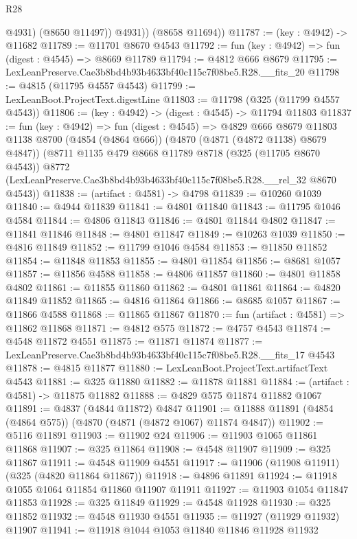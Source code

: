 \begin{lexlean}{R28}
\begin{coremodule}
              @4931)
            (@8650 @11497))
          @4931))
      (@8658 @11694))
@11787 := (key : @4942) -> @11682
@11789 := @11701 @8670 @4543
@11792 := fun (key : @4942) => fun (digest : @4545) => @8669 @11789
@11794 := @4812 @666 @8679
@11795 := LexLeanPreserve.Cae3b8bd4b93b4633bf40c115c7f08be5.R28.__fits_20
@11798 := @4815 (@11795 @4557 @4543)
@11799 := LexLeanBoot.ProjectText.digestLine
@11803 := @11798 (@325 (@11799 @4557 @4543))
@11806 := (key : @4942) -> (digest : @4545) -> @11794 @11803
@11837 := fun (key : @4942) =>
  fun (digest : @4545) =>
  @4829
    @666
    @8679
    @11803
    @1138
    @8700
    (@4854 (@4864 @666))
    (@4870 (@4871 (@4872 @1138) @8679 @4847))
    (@8711
      @1135
      @479
      @8668
      @11789
      @8718
      (@325 (@11705 @8670 @4543))
      @8772
      (LexLeanPreserve.Cae3b8bd4b93b4633bf40c115c7f08be5.R28.__rel_32 @8670 @4543))
@11838 := (artifact : @4581) -> @4798
@11839 := @10260 @1039
@11840 := @4944 @11839
@11841 := @4801 @11840
@11843 := @11795 @1046 @4584
@11844 := @4806 @11843
@11846 := @4801 @11844 @4802
@11847 := @11841 @11846
@11848 := @4801 @11847
@11849 := @10263 @1039
@11850 := @4816 @11849
@11852 := @11799 @1046 @4584
@11853 := @11850 @11852
@11854 := @11848 @11853
@11855 := @4801 @11854
@11856 := @8681 @1057
@11857 := @11856 @4588
@11858 := @4806 @11857
@11860 := @4801 @11858 @4802
@11861 := @11855 @11860
@11862 := @4801 @11861
@11864 := @4820 @11849 @11852
@11865 := @4816 @11864
@11866 := @8685 @1057
@11867 := @11866 @4588
@11868 := @11865 @11867
@11870 := fun (artifact : @4581) => @11862 @11868
@11871 := @4812 @575
@11872 := @4757 @4543
@11874 := @4548 @11872 @4551
@11875 := @11871 @11874
@11877 := LexLeanPreserve.Cae3b8bd4b93b4633bf40c115c7f08be5.R28.__fits_17 @4543
@11878 := @4815 @11877
@11880 := LexLeanBoot.ProjectText.artifactText @4543
@11881 := @325 @11880
@11882 := @11878 @11881
@11884 := (artifact : @4581) -> @11875 @11882
@11888 := @4829 @575 @11874 @11882 @1067
@11891 := @4837 (@4844 @11872) @4847
@11901 := @11888 @11891 (@4854 (@4864 @575)) (@4870 (@4871 (@4872 @1067) @11874 @4847))
@11902 := @5116 @11891
@11903 := @11902 @24
@11906 := @11903 @1065 @11861 @11868
@11907 := @325 @11864
@11908 := @4548 @11907
@11909 := @325 @11867
@11911 := @4548 @11909 @4551
@11917 := @11906 (@11908 @11911) (@325 (@4820 @11864 @11867))
@11918 := @4896 @11891
@11924 := @11918 @1055 @1064 @11854 @11860 @11907 @11911
@11927 := @11903 @1054 @11847 @11853
@11928 := @325 @11849
@11929 := @4548 @11928
@11930 := @325 @11852
@11932 := @4548 @11930 @4551
@11935 := @11927 (@11929 @11932) @11907
@11941 := @11918 @1044 @1053 @11840 @11846 @11928 @11932

\end{coremodule}
\end{lexlean}
